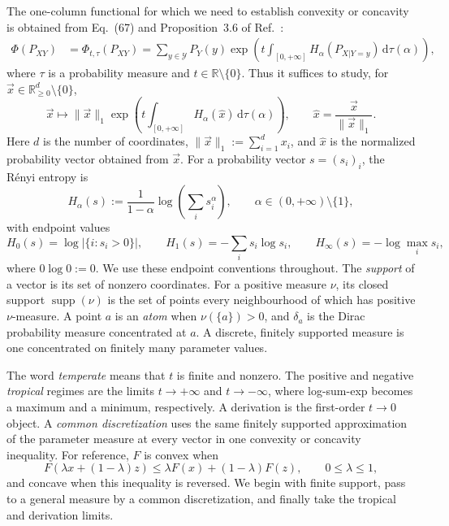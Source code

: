\documentclass[aps,pra,11pt,onecolumn,nofootinbib,tightenlines]{revtex4-2}
\theoremstyle{definition}
\newcommand{\R}{\mathbb{R}}
\newcommand{\Y}{\mathcal{Y}}
\def\d{\mathrm{d}}
\newcommand{\ParameterMainTemperateForm}{Eq.~(67) and Proposition~3.6 of Ref.~\cite{rubboli2026complete}}
\begin{document}
The one-column functional for which we need to establish convexity or concavity is
obtained from \ParameterMainTemperateForm:
\begin{align}
\label{eq:TemperateForm}
\Phi(P_{XY})&=\Phi_{t,\tau}(P_{XY})
=\sum_{y\in\Y}P_Y(y)
  \exp\!\left(t\int_{[0,+\infty]}H_\alpha(P_{X|Y=y})\,
  \d\tau(\alpha)\right),
\end{align}
where $\tau$ is a probability measure and
$t\in\R\setminus\{0\}$.  Thus it suffices to study, for
$\vec{x}\in\R^d_{\geq0}\setminus\{0\}$,
\begin{equation}
\label{eq:conditionfunct}
\vec{x}\longmapsto
\|\vec{x}\|_1\exp\!\left(
t\int_{[0,+\infty]}H_\alpha(\hat{x})\,\d\tau(\alpha)
\right),
\qquad
\hat{x}=\frac{\vec{x}}{\|\vec{x}\|_1}.
\end{equation}
Here $d$ is the number of coordinates,
$\|\vec{x}\|_1:=\sum_{i=1}^d x_i$, and $\hat{x}$ is the normalized probability
vector obtained from $\vec{x}$.  For a probability vector $s=(s_i)_i$, the
R\'enyi entropy is
\[
H_\alpha(s):=\frac{1}{1-\alpha}\log\!\left(\sum_i s_i^\alpha\right),
\qquad \alpha\in(0,+\infty)\setminus\{1\},
\]
with endpoint values
\[
H_0(s)=\log|\{i:s_i>0\}|,
\qquad
H_1(s)=-\sum_i s_i\log s_i,
\qquad
H_\infty(s)=-\log\max_i s_i,
\]
where $0\log0:=0$.  We use these endpoint conventions throughout.  The
\emph{support} of a
vector is its set of nonzero coordinates.  For a positive measure $\nu$, its
closed support $\operatorname{supp}(\nu)$ is the set of points every
neighbourhood of which has positive $\nu$-measure.  A point $a$ is an
\emph{atom} when $\nu(\{a\})>0$, and $\delta_a$ is the Dirac probability
measure concentrated at $a$.  A discrete, finitely supported measure is one
concentrated on finitely many parameter values.

The word \emph{temperate} means that $t$ is finite and nonzero.  The positive
and negative \emph{tropical} regimes are the limits $t\to+\infty$ and
$t\to-\infty$, where log-sum-exp becomes a maximum and a minimum,
respectively.  A derivation is the first-order $t\to0$ object.  A
\emph{common discretization} uses the same finitely supported approximation
of the parameter measure at every vector in one convexity or concavity
inequality.  For reference, $F$ is convex when
\[
F(\lambda x+(1-\lambda)z)
\leq \lambda F(x)+(1-\lambda)F(z),
\qquad 0\leq\lambda\leq1,
\]
and concave when this inequality is reversed.  We begin with finite support,
pass to a general measure by a common discretization, and finally take the
tropical and derivation limits.
\end{document}
